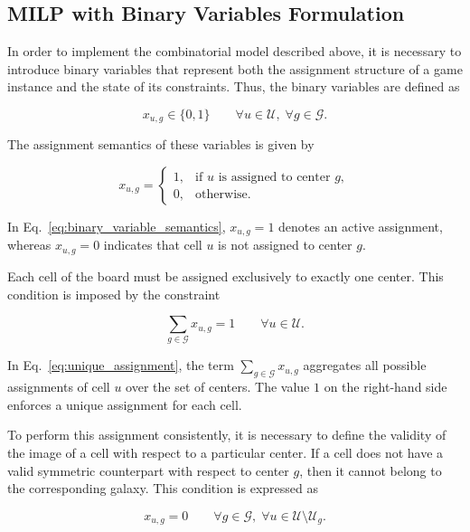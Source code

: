 \subsection{MILP with Binary Variables Formulation}

In order to implement the combinatorial model described above, it is necessary to introduce binary variables that represent both the assignment structure of a game instance and the state of its constraints. Thus, the binary variables are defined as

\begin{equation}
x_{u,g} \in \{0,1\}
\qquad
\forall u \in \mathcal{U}, \; \forall g \in \mathcal{G}.
\label{eq:binary_variables}
\end{equation}

The assignment semantics of these variables is given by

\begin{equation}
x_{u,g} =
\begin{cases}
1, & \text{if } u \text{ is assigned to center } g,\\
0, & \text{otherwise.}
\end{cases}
\label{eq:binary_variable_semantics}
\end{equation}

In Eq.~\ref{eq:binary_variable_semantics}, \(x_{u,g}=1\) denotes an active assignment, whereas \(x_{u,g}=0\) indicates that cell \(u\) is not assigned to center \(g\).

Each cell of the board must be assigned exclusively to exactly one center. This condition is imposed by the constraint

\begin{equation}
\sum_{g \in \mathcal{G}} x_{u,g} = 1
\qquad
\forall u \in \mathcal{U}.
\label{eq:unique_assignment}
\end{equation}

In Eq.~\ref{eq:unique_assignment}, the term \(\sum_{g \in \mathcal{G}} x_{u,g}\) aggregates all possible assignments of cell \(u\) over the set of centers. The value \(1\) on the right-hand side enforces a unique assignment for each cell.

To perform this assignment consistently, it is necessary to define the validity of the image of a cell with respect to a particular center. If a cell does not have a valid symmetric counterpart with respect to center \(g\), then it cannot belong to the corresponding galaxy. This condition is expressed as

\begin{equation}
x_{u,g} = 0
\qquad
\forall g \in \mathcal{G}, \; \forall u \in \mathcal{U} \setminus \mathcal{U}_g.
\label{eq:invalid_assignment}
\end{equation}

